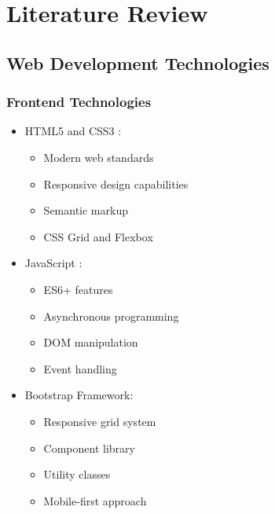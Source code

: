 \chapter{Literature Review}
\label{chap:literature}

\section{Web Development Technologies}
\subsection{Frontend Technologies}
\begin{itemize}
    \item HTML5 and CSS3 \cite{webdev2023}:
    \begin{itemize}
        \item Modern web standards
        \item Responsive design capabilities
        \item Semantic markup
        \item CSS Grid and Flexbox
    \end{itemize}
    \item JavaScript \cite{reactjs}:
    \begin{itemize}
        \item ES6+ features
        \item Asynchronous programming
        \item DOM manipulation
        \item Event handling
    \end{itemize}
    \item Bootstrap Framework:
    \begin{itemize}
        \item Responsive grid system
        \item Component library
        \item Utility classes
        \item Mobile-first approach
    \end{itemize}
\end{itemize}

